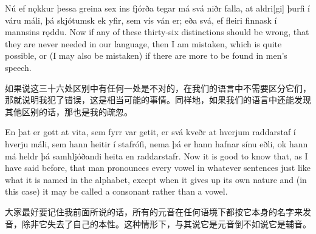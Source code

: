 \begin{paracol}{2}
  Nú ef nǫkkur þessa greina sex ins fjórða tegar má svá niðr falla, at aldri[gi] þurfi í váru máli, þá skjótumsk ek yfir, sem vís ván er; eða svá, ef fleiri finnask í mannsins rǫddu.
  \switchcolumn
  Now if any of these thirty-six distinctions should be wrong, that they are never needed in our language, then I am mistaken, which is quite possible, or (I may also be mistaken) if there are more to be found in men's speech.
\end{paracol}
\begin{translation*}{}
  如果说这三十六处区别中有任何一处是不对的，在我们的语言中不需要区分它们，那就说明我犯了错误，这是相当可能的事情。同样地，如果我们的语言中还能发现其他区别的话，那也是我的疏忽。
\end{translation*}

\begin{paracol}{2}
  En þat er gott at vita, sem fyrr var getit, er svá kveðr at hverjum raddarstaf í hverju máli, sem hann heitir í stafrófi, nema þá er hann hafnar sínu eðli, ok hann má heldr þá sam\-hljóðandi heita en raddarstafr.\footnotemark
  \switchcolumn
  Now it is good to know that, as I have said before, that man pronounces every vowel in whatever sentences just like what it is named in the alphabet, except when it gives up its own nature and (in this case) it may be called a consonant rather than a vowel.
\end{paracol}

\begin{translation*}{}
  大家最好要记住我前面所说的话，所有的元音在任何语境下都按它本身的名字来发音，除非它失去了自己的本性。这种情形下，与其说它是元音倒不如说它是辅音。
\end{translation*}

